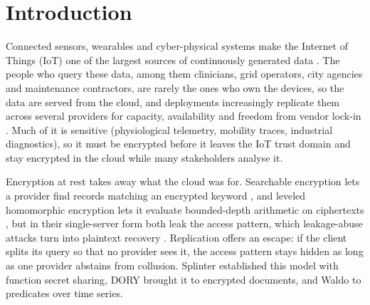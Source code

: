 \section{Introduction}
\label{sec:intro}

Connected sensors, wearables and cyber-physical systems make the Internet of
Things (IoT) one of the largest sources of continuously generated data
\citep{atzori2010internet}. The people who query these data, among them
clinicians, grid operators, city agencies and maintenance contractors, are
rarely the ones who own the devices, so the data are served from the cloud, and
deployments increasingly replicate them across several providers for capacity,
availability and freedom from vendor lock-in
\citep{petcu2013multicloud,grozev2014intercloud}. Much of it is sensitive
(physiological telemetry, mobility traces, industrial diagnostics), so it must
be encrypted before it leaves the IoT trust domain and stay encrypted in the
cloud while many stakeholders analyse it.

Encryption at rest takes away what the cloud was for. Searchable encryption
lets a provider find records matching an encrypted keyword
\citep{song2000practical,curtmola2006searchable,islam2023keyword}, and leveled
homomorphic encryption lets it evaluate bounded-depth arithmetic on
ciphertexts \citep{fan2012somewhat,cryptoeprint:2016/421}, but in their
single-server form both leak the access pattern, which leakage-abuse attacks
turn into plaintext recovery
\citep{islam2012access,cash2015leakage,grubbs2017leakage}. Replication offers
an escape: if the client splits its query so that no provider sees it, the
access pattern stays hidden as long as one provider abstains from collusion.
Splinter \citep{splinter} established this model with function secret sharing,
DORY \citep{dory} brought it to encrypted documents, and Waldo \citep{waldo} to
predicates over time series.

